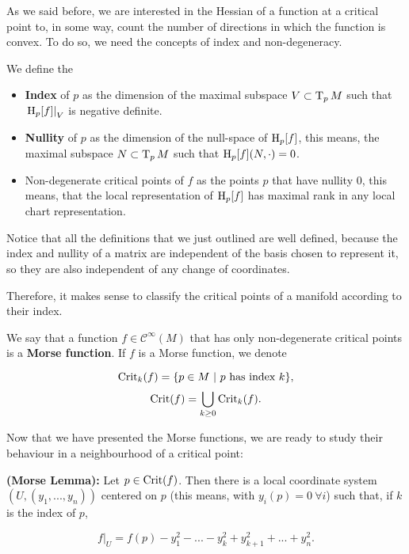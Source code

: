 As we said before, we are interested in the Hessian of a function at a critical point to, in some way, count the number of directions in which the function is convex. To do so, we need the concepts of index and non-degeneracy.

\begin{deff}
	We define the

\begin{itemize}
	\item {\bf Index} of $p$ as the dimension of the maximal subspace $V \subset \operatorname T_pM$ such that $\left. \operatorname H_p[f] \right|_V$ is negative definite.
	\item {\bf Nullity} of $p$ as the dimension of the null-space of $\operatorname H_p[f]$, this means, the maximal subspace $N \subset \operatorname T_pM$ such that $\operatorname H_p[f](N,\cdot) = 0$.
	\item {Non-degenerate critical points} of $f$ as the points $p$ that have nullity $0$, this means, that the local representation of $\operatorname H_p[f]$ has maximal rank in any local chart representation.
\end{itemize}
\end{deff}

Notice that all the definitions that we just outlined are well defined, because the index and nullity of a matrix are independent of the basis chosen to represent it, so they are also independent of any change of coordinates.

Therefore, it makes sense to classify the critical points of a manifold according to their index.

\begin{deff}
	We say that a function $f \in \mathcal{C}^{\infty}(M)$ that has only non-degenerate critical points is a {\bf Morse function}.
	If $f$ is a Morse function, we denote

	\begin{displaymath}
		\text{Crit}_k(f) = \{p \in M \ | \text{ $p$ has index $k$}\} ,
	\end{displaymath}
	\begin{displaymath}
		\text{Crit}(f) = \bigcup_{k \geq 0} \text{Crit}_k(f) .
	\end{displaymath}
\end{deff}

Now that we have presented the Morse functions, we are ready to study their behaviour in a neighbourhood of a critical point:

\begin{prop}
	{\bf (Morse Lemma):} Let $p \in \text{Crit}(f)$. Then there is a local coordinate system $(U,(y_1,...,y_n))$ centered on $p$ (this means, with $y_i(p) = 0 \ \forall i$) such that, if $k$ is the index of $p$,

$$\left. f \right|_U = f(p) - y_1^2 - ... - y_k^2 + y_{k+1}^2 + ... + y_n^2 .$$
\end{prop}

